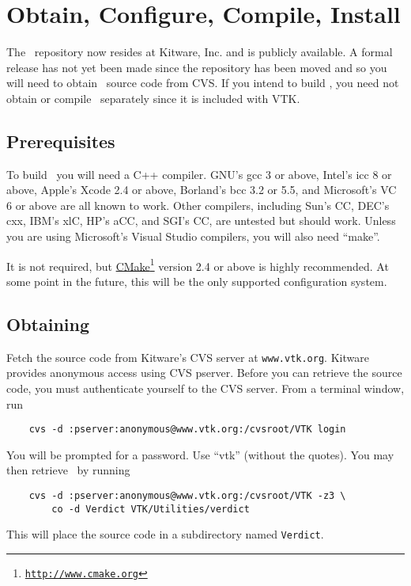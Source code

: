 \chapter{Obtain, Configure, Compile, Install}

The \verd\ repository now resides at Kitware, Inc. and is publicly available.
A formal release has not yet been made since the repository has been moved and
so you will need to obtain \verd\ source code from CVS.
If you intend to build \vtk,
you need not obtain or compile \verd\ separately since it is included with VTK.

\section{Prerequisites}

To build \verd\ you will need a C++ compiler.
GNU's gcc 3 or above, Intel's icc 8 or above, Apple's Xcode 2.4 or above,
Borland's bcc 3.2 or 5.5, and Microsoft's VC 6 or above are all known to work.
Other compilers, including Sun's CC, DEC's cxx, IBM's xlC, HP's aCC, and SGI's CC, are untested but should work.
Unless you are using Microsoft's Visual Studio compilers, you will also need ``make''.

It is not required, but \href{http://www.cmake.org/}{CMake}\footnote{\texttt{\href{http://www.cmake.org}{http://www.cmake.org}}}
version 2.4 or above is highly recommended.
At some point in the future, this will be the only supported configuration system.

\section{Obtaining \verd}

Fetch the source code from Kitware's CVS server at \texttt{www.vtk.org}.
Kitware provides anonymous access using CVS pserver.
Before you can retrieve the source code, you must authenticate yourself to the CVS server.
From a terminal window, run
\begin{verbatim}
    cvs -d :pserver:anonymous@www.vtk.org:/cvsroot/VTK login
\end{verbatim}
You will be prompted for a password. Use ``vtk'' (without the quotes).
You may then retrieve \verd\ by running
\begin{verbatim}
    cvs -d :pserver:anonymous@www.vtk.org:/cvsroot/VTK -z3 \
        co -d Verdict VTK/Utilities/verdict
\end{verbatim}
This will place the source code in a subdirectory named \texttt{Verdict}.

